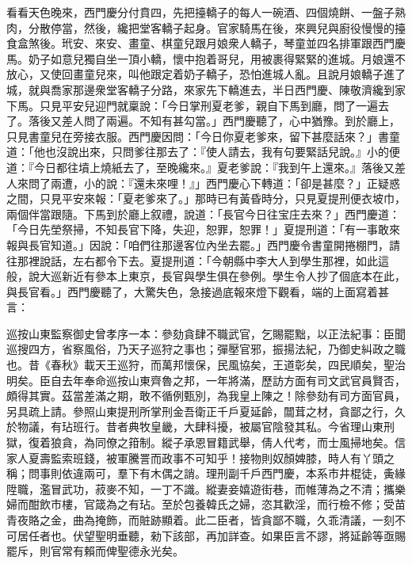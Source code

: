 看看天色晚來，西門慶分付賁四，先把擡轎子的每人一碗酒、四個燒餅、一盤子熟肉，分散停當，然後，纔把堂客轎子起身。官家騎馬在後，來興兒與廚役慢慢的擡食盒煞後。玳安、來安、畫童、棋童兒跟月娘衆人轎子，琴童並四名排軍跟西門慶馬。奶子如意兒獨自坐一頂小轎，懷中抱着哥兒，用被裹得緊緊的進城。月娘還不放心，又使回畫童兒來，叫他跟定着奶子轎子，恐怕進城人亂。{}且說月娘轎子進了城，就與喬家那邊衆堂客轎子分路，來家先下轎進去，半日西門慶、陳敬濟纔到家下馬。只見平安兒迎門就稟說：「今日掌刑夏老爹，親自下馬到廳，問了一遍去了。落後又差人問了兩遍。不知有甚勾當。」{}西門慶聽了，心中猶豫。到於廳上，只見書童兒在旁接衣服。西門慶因問：「今日你夏老爹來，留下甚麼話來？」書童道：「他也沒說出來，只問爹往那去了：『使人請去，我有句要緊話兒說。』小的便道：『今日都往墳上燒紙去了，至晚纔來。』夏老爹說：『我到午上還來。』落後又差人來問了兩遭，小的說：『還未來哩！』」西門慶心下轉道：「卻是甚麼？」正疑惑之間，只見平安來報：「夏老爹來了。」那時已有黃昏時分，只見夏提刑便衣坡巾，兩個伴當跟隨。下馬到於廳上叙禮，說道：「長官今日往宝庄去來？」西門慶道：「今日先塋祭掃，不知長官下降，失迎，恕罪，恕罪！」夏提刑道：「有一事敢來報與長官知道。」因說：「咱們往那邊客位內坐去罷。」西門慶令書童開捲棚門，請往那裡說話，左右都令下去。夏提刑道：「今朝縣中李大人到學生那裡，如此這般，說大巡新近有參本上東京，長官與學生俱在參例。學生令人抄了個底本在此，與長官看。」西門慶聽了，大驚失色，急接過底報來燈下觀看，端的上面寫着甚言：

巡按山東監察御史曾孝序一本：參劾貪肆不職武官，乞賜罷黜，以正法紀事：臣聞巡搜四方，省察風俗，乃天子巡狩之事也；彈壓官邪，振揚法紀，乃御史糾政之職也。昔《春秋》載天王巡狩，而萬邦懷保，民風協矣，王道彰矣，四民順矣，聖治明矣。臣自去年奉命巡按山東齊魯之邦，一年將滿，歷訪方面有司文武官員賢否，頗得其實。茲當差滿之期，敢不循例甄別，為我皇上陳之！除參劾有司方面官員，另具疏上請。參照山東提刑所掌刑金吾衛正千戶夏延齡，闒茸之材，貪鄙之行，久於物議，有玷班行。昔者典牧皇畿，大肆科擾，被屬官陰發其私。今省理山東刑獄，復着狼貪，為同僚之箝制。縱子承恩冒籍武舉，倩人代考，而士風掃地矣。信家人夏壽監索班錢，被軍騰詈而政事不可知乎！接物則奴顏婢膝，時人有丫頭之稱；問事則依違兩可，羣下有木偶之誚。理刑副千戶西門慶，本系市井棍徒，夤緣陞職，濫冒武功，菽麥不知，一丁不識。縱妻妾嬉遊街巷，而帷薄為之不清；攜樂婦而酣飲市樓，官箴為之有玷。至於包養韓氏之婦，恣其歡淫，而行檢不修；受苗青夜賂之金，曲為掩飾，而賍跡顯着。此二臣者，皆貪鄙不職，久乖清議，一刻不可居任者也。伏望聖明垂聽，勑下該部，再加詳查。如果臣言不謬，將延齡等亟賜罷斥，則官常有賴而俾聖德永光矣。

